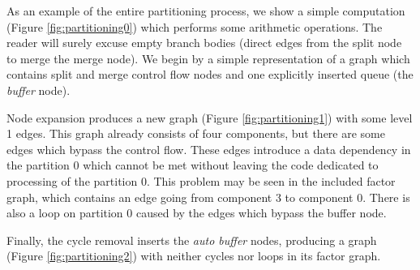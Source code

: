 As an example of the entire partitioning process, we show a simple computation (Figure \ref{fig:partitioning0}) which performs some arithmetic operations. The reader will surely excuse empty branch bodies (direct edges from the split node to merge the merge node). We begin by a simple representation of a graph which contains split and merge control flow nodes and one explicitly inserted queue (the \emph{buffer} node).

Node expansion produces a new graph (Figure \ref{fig:partitioning1}) with some level 1 edges. This graph already consists of four components, but there are some edges which bypass the control flow. These edges introduce a data dependency in the partition 0 which cannot be met without leaving the code dedicated to processing of the partition 0. This problem may be seen in the included factor graph, which contains an edge going from component 3 to component 0. There is also a loop on partition 0 caused by the edges which bypass the buffer node. 

Finally, the cycle removal inserts the \emph{auto buffer} nodes, producing a graph (Figure \ref{fig:partitioning2}) with neither cycles nor loops in its factor graph.


